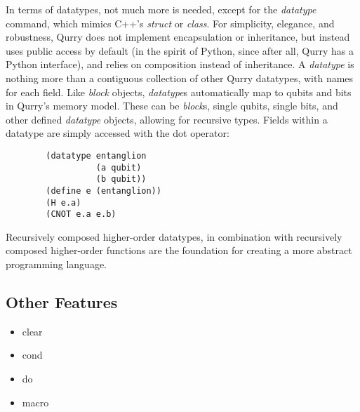 \documentclass[journal]{article}
\begin{document}
    In terms of datatypes, not much more is needed, except for the \emph{datatype} command, which mimics C++'s \emph{struct} or \emph{class}.
    For simplicity, elegance, and robustness, Qurry does not implement encapsulation or inheritance, but instead uses public access by default (in the spirit of Python, since after all, Qurry has a Python interface), and relies on composition instead of inheritance.
    A \emph{datatype} is nothing more than a contiguous collection of other Qurry datatypes, with names for each field.
    Like \emph{block} objects, \emph{datatype}s automatically map to qubits and bits in Qurry's memory model.
    These can be \emph{block}s, single qubits, single bits, and other defined \emph{datatype} objects, allowing for recursive types.
    Fields within a datatype are simply accessed with the dot operator:
    \begin{verbatim}
        (datatype entanglion
                  (a qubit)
                  (b qubit))
        (define e (entanglion))
        (H e.a)
        (CNOT e.a e.b)
    \end{verbatim}

    Recursively composed higher-order datatypes, in combination with recursively composed higher-order functions are the foundation for creating a more abstract programming language.

    \subsection{Other Features}

    \begin{itemize}
        \item clear 	    
        \item cond 	    
        \item do 	        
        \item macro 	    
    \end{itemize}
\end{document}
